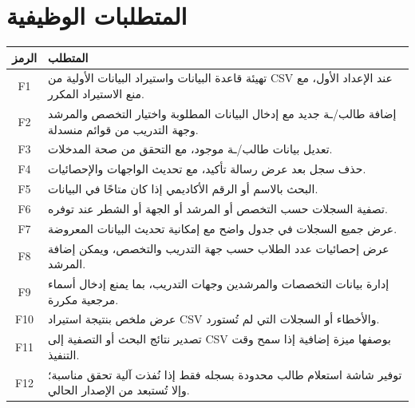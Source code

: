 \documentclass[12pt,a4paper]{article}
\begin{document}
\section{المتطلبات الوظيفية}
\begin{longtable}{|C|p{12cm}|}
\hline
\textbf{الرمز} & \textbf{المتطلب}\\ \hline
F1 & تهيئة قاعدة البيانات واستيراد البيانات الأولية من CSV عند الإعداد الأول، مع منع الاستيراد المكرر.\\ \hline
F2 & إضافة طالب/ـة جديد مع إدخال البيانات المطلوبة واختيار التخصص والمرشد وجهة التدريب من قوائم منسدلة.\\ \hline
F3 & تعديل بيانات طالب/ـة موجود، مع التحقق من صحة المدخلات.\\ \hline
F4 & حذف سجل بعد عرض رسالة تأكيد، مع تحديث الواجهات والإحصائيات.\\ \hline
F5 & البحث بالاسم أو الرقم الأكاديمي إذا كان متاحًا في البيانات.\\ \hline
F6 & تصفية السجلات حسب التخصص أو المرشد أو الجهة أو الشطر عند توفره.\\ \hline
F7 & عرض جميع السجلات في جدول واضح مع إمكانية تحديث البيانات المعروضة.\\ \hline
F8 & عرض إحصائيات عدد الطلاب حسب جهة التدريب والتخصص، ويمكن إضافة المرشد.\\ \hline
F9 & إدارة بيانات التخصصات والمرشدين وجهات التدريب، بما يمنع إدخال أسماء مرجعية مكررة.\\ \hline
F10 & عرض ملخص بنتيجة استيراد CSV والأخطاء أو السجلات التي لم تُستورد.\\ \hline
F11 & تصدير نتائج البحث أو التصفية إلى CSV بوصفها ميزة إضافية إذا سمح وقت التنفيذ.\\ \hline
F12 & توفير شاشة استعلام طالب محدودة بسجله فقط إذا نُفذت آلية تحقق مناسبة؛ وإلا تُستبعد من الإصدار الحالي.\\ \hline
\end{longtable}
\end{document}
